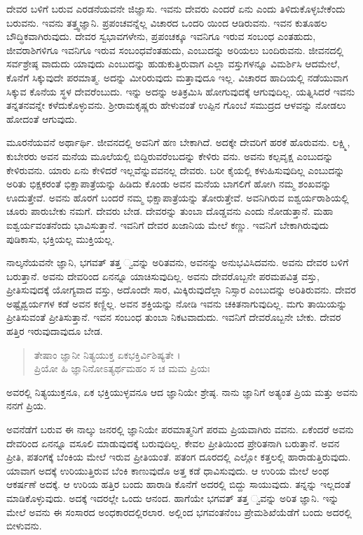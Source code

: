 ದೇವರ ಬಳಿಗೆ ಬರುವ ಎರಡನೆಯವನೇ ಜಿಜ್ಞಾಸು. ಇವನು ದೇವರು ಎಂದರೆ ಏನು ಎಂದು ತಿಳಿದುಕೊಳ್ಳಬೇಕೆಂದು ಬರುವನು. ಇವನು ತತ್ತ್ವಜ್ಞಾನಿ. ಪ್ರಪಂಚವನ್ನೆಲ್ಲ ವಿಚಾರದ ಒಂದರಿ ಯಿಂದ ಆಡಿರುವನು. ಇವನ ಕುತೂಹಲ ಬೌದ್ಧಿಕವಾಗಿರುವುದು. ದೇವರ ಸ್ವಭಾವಗಳೇನು, ಪ್ರಪಂಚಕ್ಕೂ ಇವನಿಗೂ ಇರುವ ಸಂಬಂಧ ಎಂತಹುದು, ಜೀವರಾಶಿಗಳಿಗೂ ಇವನಿಗೂ ಇರುವ ಸಂಬಂಧವೆಂತಹುದು, ಎಂಬುದನ್ನು ಅರಿಯಲು ಬಂದಿರುವನು. ಜೀವನದಲ್ಲಿ ಸರ್ವಶ್ರೇಷ್ಠ ವಾದುದು ಯಾವುದು ಎಂಬುದನ್ನು ಹುಡುಕುತ್ತಿರುವಾಗ ಎಲ್ಲಾ ವಸ್ತುಗಳನ್ನೂ ವಿಮರ್ಶಿಸಿ ಆದಮೇಲೆ, ಕೊನೆಗೆ ಸಿಕ್ಕುವುದೇ ಪರಮಾತ್ಮ. ಅದನ್ನು ಮೀರಿರುವುದು ಮತ್ತಾವುದೂ ಇಲ್ಲ. ವಿಚಾರದ ಹಾದಿಯಲ್ಲಿ ನಡೆಯುವಾಗ ಸಿಕ್ಕುವ ಕೊನೆಯ ಸ್ಥಳ ದೇವರೆಂಬುದು. ಇನ್ನು ಅದನ್ನು ಅತಿಕ್ರಮಿಸಿ ಹೋಗುವುದಕ್ಕೆ ಆಗುವುದಿಲ್ಲ. ಯತ್ನಿಸಿದರೆ ಇವನು ತನ್ನತನವನ್ನೇ ಕಳೆದುಕೊಳ್ಳುವನು. ಶ್ರೀರಾಮಕೃಷ್ಣರು ಹೇಳುವಂತೆ ಉಪ್ಪಿನ ಗೊಂಬೆ ಸಮುದ್ರದ ಆಳವನ್ನು ನೋಡಲು ಹೋದಂತೆ ಆಗುವುದು.

ಮೂರನೆಯವನೆ ಅರ್ಥಾರ್ಥಿ. ಜೀವನದಲ್ಲಿ ಅವನಿಗೆ ಹಣ ಬೇಕಾಗಿದೆ. ಅದಕ್ಕೇ ದೇವರಿಗೆ ಹರಕೆ ಹೊರುವನು. ಲಕ್ಷ್ಮಿ, ಕುಬೇರರು ಅವನ ಮನೆಯ ಮೂಲೆಯಲ್ಲಿ ಬಿದ್ದಿರುವರೆಂಬದನ್ನು ಕೇಳಿರು ವನು. ಅವನು ಕಲ್ಪವೃಕ್ಷ ಎಂಬುದನ್ನು ಕೇಳಿರುವನು. ಯಾರು ಏನು ಕೇಳಿದರೆ ಇಲ್ಲವೆನ್ನುವವನಲ್ಲ ದೇವರು. ಬರೀ ಕೈಯಲ್ಲಿ ಕಳುಹಿಸುವುದಿಲ್ಲ ಎಂಬುದನ್ನು ಅರಿತು ಭಿಕ್ಷಕರಂತೆ ಭಿಕ್ಷಾಪಾತ್ರೆಯನ್ನು ಹಿಡಿದು ಕೊಂಡು ಅವನ ಮನೆಯ ಬಾಗಲಿಗೆ ಹೋಗಿ ನಮ್ಮ ಶಂಖವನ್ನು ಊದುತ್ತೇವೆ. ಅವನು ಹೊರಗೆ ಬಂದರೆ ನಮ್ಮ ಭಿಕ್ಷಾಪಾತ್ರೆಯನ್ನು ತೋರುತ್ತೇವೆ. ಅವನಿಗಿರುವ ಐಶ್ವರ್ಯರಾಶಿಯಲ್ಲಿ ಚೂರು ಪಾರುಬೇಕು ನಮಗೆ. ದೇವರು ಬೇಡ. ದೇವರನ್ನು ತುಂಬಾ ದೊಡ್ಡವನು ಎಂದು ನೋಡುತ್ತಾನೆ. ಮಹಾ ಐಶ್ವರ್ಯವಂತನೆಂದು ಭಾವಿಸುತ್ತಾನೆ. ಇವನಿಗೆ ದೇವರ ಖಜಾನಿಯ ಮೇಲೆ ಕಣ್ಣು. ಇವನಿಗೆ ಬೇಕಾಗಿರುವುದು ಪುಡಿಕಾಸು, ಭಕ್ತಿಯಲ್ಲ ಮುಕ್ತಿಯಲ್ಲ.

ನಾಲ್ಕನೆಯವನೇ ಜ್ಞಾನಿ, ಭಗವತ್ ತತ್ತ ್ವವನ್ನು ಅರಿತವನು, ಅವನನ್ನು ಅನುಭವಿಸಿದವನು. ಅವನು ದೇವರ ಬಳಿಗೆ ಬರುತ್ತಾನೆ. ಅವನು ದೇವರಿಂದ ಏನನ್ನೂ ಯಾಚಿಸುವುದಿಲ್ಲ. ಅವನು ದೇವರೊಬ್ಬನೇ ಪರಮಪವಿತ್ರ ವಸ್ತು, ಪ್ರೀತಿಸುವುದಕ್ಕೆ ಯೋಗ್ಯವಾದ ವಸ್ತು, ಅದೊಂದೇ ಸಾರ, ಮಿಕ್ಕಿರುವುದೆಲ್ಲಾ ನಿಸ್ಸಾರ ಎಂಬುದನ್ನು ಅರಿತಿರುವನು. ದೇವರ ಅಷ್ಟೈಶ್ವರ್ಯಗಳ ಕಡೆ ಅವನ ಕಣ್ಣಿಲ್ಲ. ಅವನ ಶಕ್ತಿಯನ್ನು ನೋಡಿ ಇವನು ಚಕಿತನಾಗುವುದಿಲ್ಲ. ಮಗು ತಾಯಿಯನ್ನು ಪ್ರೀತಿಸುವಂತೆ ಪ್ರೀತಿಸುತ್ತಾನೆ. ಇವನ ಸಂಬಂಧ ತುಂಬಾ ನಿಕಟವಾದುದು. ಇವನಿಗೆ ದೇವರೊಬ್ಬನೇ ಬೇಕು. ದೇವರ ಹತ್ತಿರ ಇರುವುದಾವುದೂ ಬೇಡ.

\begin{verse}
ತೇಷಾಂ ಜ್ಞಾನೀ ನಿತ್ಯಯುಕ್ತ ಏಕಭಕ್ತಿರ್ವಿಶಿಷ್ಯತೇ ।\\ಪ್ರಿಯೋ ಹಿ ಜ್ಞಾನಿನೋಽತ್ಯರ್ಥಮಹಂ ಸ ಚ ಮಮ ಪ್ರಿಯಃ 
\end{verse}

{\small ಅವರಲ್ಲಿ ನಿತ್ಯಯುಕ್ತನೂ, ಏಕ ಭಕ್ತಿಯುಳ್ಳವನೂ ಆದ ಜ್ಞಾನಿಯೇ ಶ್ರೇಷ್ಠ. ನಾನು ಜ್ಞಾನಿಗೆ ಅತ್ಯಂತ ಪ್ರಿಯ ಮತ್ತು ಅವನು ನನಗೆ ಪ್ರಿಯ.}

ಅವನೆಡೆಗೆ ಬರುವ ಈ ನಾಲ್ಕು ಜನರಲ್ಲಿ ಜ್ಞಾನಿಯೇ ಪರಮಾತ್ಮನಿಗೆ ಪರಮ ಪ್ರಿಯವಾಗಿರು ವವನು. ಏಕೆಂದರೆ ಅವನು ದೇವರಿಂದ ಏನನ್ನೂ ವಸೂಲಿ ಮಾಡುವುದಕ್ಕೆ ಬರುವುದಿಲ್ಲ. ಕೇವಲ ಪ್ರೀತಿಯಿಂದ ಪ್ರೇರಿತನಾಗಿ ಬರುತ್ತಾನೆ. ಅವನ ಪ್ರೀತಿ, ಪತಂಗಕ್ಕೆ ಬೆಂಕಿಯ ಮೇಲೆ ಇರುವ ಪ್ರೀತಿಯಂತೆ. ಪತಂಗ ದೂರದಲ್ಲಿ ಎಲ್ಲೋ ಕತ್ತಲಲ್ಲಿ ಹಾರಾಡುತ್ತಿರುವುದು. ಯಾವಾಗ ಅದಕ್ಕೆ ಉರಿಯುತ್ತಿರುವ ಬೆಂಕಿ ಕಾಣುವುದೊ ಅತ್ತ ಕಡೆ ಧಾವಿಸುವುದು. ಆ ಉರಿಯ ಮೇಲೆ ಅಂಥ ಆಕರ್ಷಣೆ ಅದಕ್ಕೆ. ಆ ಉರಿಯ ಹತ್ತಿರ ಬಂದು ಹಾರಾಡಿ ಕೊನೆಗೆ ಅದರಲ್ಲಿ ಬಿದ್ದು ಸಾಯುವುದು. ತನ್ನನ್ನು ಇಲ್ಲದಂತೆ ಮಾಡಿಕೊಳ್ಳುವುದು. ಅದಕ್ಕೆ ಇದರಲ್ಲೇ ಒಂದು ಆನಂದ. ಹಾಗೆಯೇ ಭಗವತ್ ತತ್ತ ್ವವನ್ನು ಅರಿತ ಜ್ಞಾನಿ. ಇನ್ನು ಮೇಲೆ ಅವನು ಈ ಸಂಸಾರದ ಅಂಧಕಾರದಲ್ಲಿರಲಾರ. ಅಲ್ಲಿಂದ ಭಗವಂತನೆಂಬ ಪ್ರೇಮಶಿಖೆಯೆಡೆಗೆ ಬಂದು ಅದರಲ್ಲಿ ಬೀಳುವನು.

